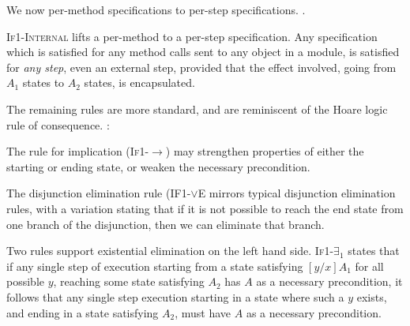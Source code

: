 We now 
per-method \Nec specifications 
to per-step \Nec specifications. 
.

\textsc{If1-Internal} 
 lifts a per-method \Nec {} to a per-step \Nec specification.
Any \Nec specification which is satisfied for any method
calls sent to any object in a module, is satisfied for \emph{any step}, even
an external step, provided that the effect involved, \ie going from $A_1$ states to
$A_2$ states, is encapsulated.

 The remaining rules are more standard, and are reminiscent of the Hoare logic rule of consequence.
:
 
The  rule for implication (\textsc{If1-$\longrightarrow$}) may strengthen
 properties of either the starting or ending state, or 
weaken the necessary precondition. 



The disjunction
elimination rule (\textsc{IF1-$\vee$E} mirrors typical disjunction elimination
rules, with a variation stating that if it is not possible  to reach 
the end state from one branch of the disjunction, then we can eliminate 
that branch. 

Two rules support existential elimination on the left hand side. 
\textsc{If1-$\exists_1$} states that if any single step of execution starting
from a state satisfying $[y/x]A_1$ for all possible $y$, reaching some state satisfying
$A_2$ has $A$ as a necessary precondition, it follows that any single step execution
starting in a state where such a $y$ exists, and ending in a state satisfying $A_2$,
must have $A$ as a necessary precondition.

